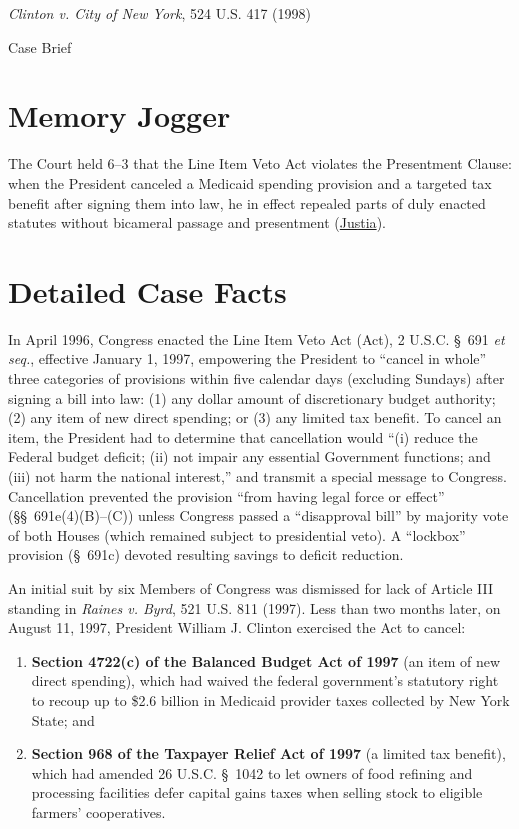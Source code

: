 \documentclass[12pt]{article}
\begin{document}
\begin{center}
{\LARGE \textit{Clinton v. City of New York}, 524 U.S. 417 (1998)\par}
\vspace{0.8em}
{\large Case Brief\par}
\end{center}
\vspace{1em}

\section{Memory Jogger}
The Court held 6--3 that the Line Item Veto Act violates the Presentment Clause: when the President canceled a Medicaid spending provision and a targeted tax benefit after signing them into law, he in effect repealed parts of duly enacted statutes without bicameral passage and presentment (\href{https://supreme.justia.com/cases/federal/us/524/417/}{Justia}).

\section{Detailed Case Facts}
In April 1996, Congress enacted the Line Item Veto Act (Act), 2 U.S.C. \S~691 \textit{et seq.}, effective January 1, 1997, empowering the President to ``cancel in whole'' three categories of provisions within five calendar days (excluding Sundays) after signing a bill into law: (1) any dollar amount of discretionary budget authority; (2) any item of new direct spending; or (3) any limited tax benefit. To cancel an item, the President had to determine that cancellation would ``(i) reduce the Federal budget deficit; (ii) not impair any essential Government functions; and (iii) not harm the national interest,'' and transmit a special message to Congress. Cancellation prevented the provision ``from having legal force or effect'' (\S\S~691e(4)(B)--(C)) unless Congress passed a ``disapproval bill'' by majority vote of both Houses (which remained subject to presidential veto). A ``lockbox'' provision (\S~691c) devoted resulting savings to deficit reduction.

An initial suit by six Members of Congress was dismissed for lack of Article III standing in \textit{Raines v. Byrd}, 521 U.S. 811 (1997). Less than two months later, on August 11, 1997, President William J. Clinton exercised the Act to cancel:
\begin{enumerate}
  \item \textbf{Section 4722(c) of the Balanced Budget Act of 1997} (an item of new direct spending), which had waived the federal government's statutory right to recoup up to \$2.6 billion in Medicaid provider taxes collected by New York State; and
  \item \textbf{Section 968 of the Taxpayer Relief Act of 1997} (a limited tax benefit), which had amended 26 U.S.C. \S~1042 to let owners of food refining and processing facilities defer capital gains taxes when selling stock to eligible farmers' cooperatives.
\end{enumerate}
\end{document}
